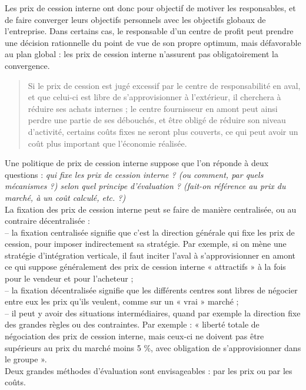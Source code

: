 \documentclass{tufte-handout}
\begin{document}
Les prix de cession interne ont donc pour objectif de motiver les responsables, et de faire converger leurs objectifs personnels avec les objectifs globaux de l’entreprise. Dans certains cas, le responsable d’un centre de profit peut prendre une décision rationnelle du point de vue de son propre optimum, mais défavorable au plan global : les prix de cession interne n’assurent pas obligatoirement la convergence.\\

\begin{verse}
Si le prix de cession est jugé excessif par le centre de responsabilité en aval, et que celui-ci est libre de s’approvisionner à l’extérieur, il cherchera à réduire ses achats internes ; le centre fournisseur en amont peut ainsi perdre une partie de ses débouchés, et être obligé de réduire son niveau d’activité, certains coûts fixes ne seront plus couverts, ce qui peut avoir un coût plus important que l'économie réalisée.\\
\end{verse}

Une politique de prix de cession interne suppose que l’on réponde à deux questions : \emph{qui fixe les prix de cession interne ? (ou comment, par quels mécanismes ?) selon quel principe d’évaluation ? (fait-on référence au prix du marché, à un coût calculé, etc. ?)}\\
La fixation des prix de cession interne peut se faire de manière centralisée, ou au contraire décentralisée :\\
– la fixation centralisée signifie que c’est la direction générale qui fixe les prix de cession, pour imposer indirectement sa stratégie. Par exemple, si on mène une stratégie d’intégration verticale, il faut inciter l’aval à s’approvisionner en amont ce qui suppose généralement des prix de cession interne « attractifs » à la fois pour le vendeur et pour l’acheteur ;\\
– la fixation décentralisée signifie que les différents centres sont libres de négocier entre eux les prix qu’ils veulent, comme sur un « vrai » marché ;\\
– il peut y avoir des situations intermédiaires, quand par exemple la direction fixe des grandes règles ou des contraintes. Par exemple : « liberté totale de négociation des prix de cession interne, mais ceux-ci ne doivent pas être supérieurs au prix du marché moins 5 \%, avec obligation de s’approvisionner dans le groupe ».\\

Deux grandes méthodes d’évaluation sont envisageables : par les prix ou par les coûts.\\
\end{document}
